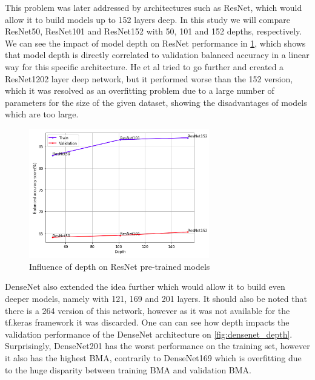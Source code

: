     This problem was later addressed by architectures such as ResNet, which would allow it to build models up to 152 layers deep. In this study we will compare ResNet50, ResNet101 and ResNet152 with 50, 101 and 152 depths, respectively. We can see the impact of model depth on ResNet performance in \ref{fig:resnet_depth}, which shows that model depth is directly correlated to validation balanced accuracy in a linear way for this specific architecture. He et al \cite{resnet} tried to go further and created a ResNet1202 layer deep network, but it performed worse than the 152 version, which it was resolved as an overfitting problem due to a large number of parameters for the size of the given dataset, showing the disadvantages of models which are too large.  \par
    \begin{figure}[ht]
        \centering
        \includegraphics[width=0.7\textwidth]{figs/resnet_depth.png}
        \caption{Influence of depth on ResNet pre-trained models}
        \label{fig:resnet_depth}
    \end{figure}
    DenseNet also extended the idea further which would allow it to build even deeper models, namely with 121, 169 and 201 layers. It should also be noted that there is a 264 version of this network, however as it was not available for the tf.keras framework it was discarded. One can can see how depth impacts the validation performance of the DenseNet architecture on \ref{fig:densenet_depth}. Surprisingly, DenseNet201 has the worst performance on the training set, however it also has the highest BMA, contrarily to DenseNet169 which is overfitting due to the huge disparity between training BMA and validation BMA. \par
